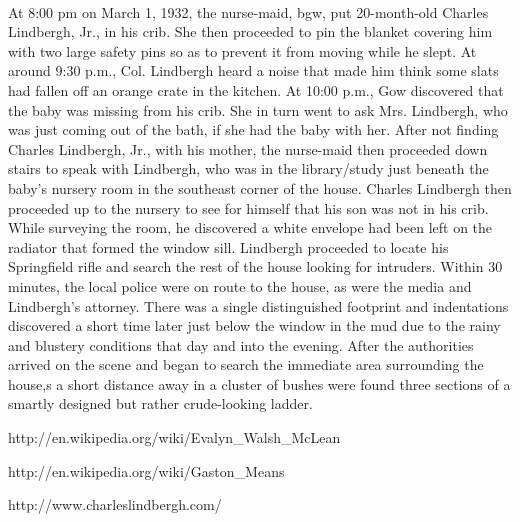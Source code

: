 \documentclass[a4paper,10pt]{article}
\begin{document}
\paragraph{} At 8:00 pm on March 1, 1932, the nurse-maid, \gls{bgw}, put 20-month-old Charles Lindbergh, Jr., in his crib. 
She then proceeded to pin the blanket covering him with two large safety pins so as to prevent it from moving while he slept.
At around 9:30 p.m., Col. Lindbergh heard a noise that made him think some slats had fallen off an orange crate in the kitchen. 
At 10:00 p.m., Gow discovered that the baby was missing from his crib. She in turn went to ask Mrs. Lindbergh, who was just coming
 out of the bath, if she had the baby with her. After not finding Charles Lindbergh, Jr., with his mother, 
the nurse-maid then proceeded down stairs to speak with Lindbergh, who was in the library/study just beneath the baby's nursery room 
in the southeast corner of the house. Charles Lindbergh then proceeded up to the nursery to see for himself that his son was not in his crib. 
While surveying the room, he discovered a white envelope had been left on the radiator that formed the window sill. Lindbergh 
proceeded to locate his Springfield rifle and search the rest of the house looking for intruders. Within 30 minutes, the local 
police were on route to the house, as were the media and Lindbergh's attorney. There was a single distinguished footprint and 
indentations discovered a short time later just below the window in the mud due to the rainy and blustery conditions that day 
and into the evening. After the authorities arrived on the scene and began to search the immediate area surrounding the house,s
 a short distance away in a cluster of bushes were found three sections of a smartly designed but rather crude-looking ladder.

http://en.wikipedia.org/wiki/Evalyn\_Walsh\_McLean

http://en.wikipedia.org/wiki/Gaston\_Means

http://www.charleslindbergh.com/




\end{document}
